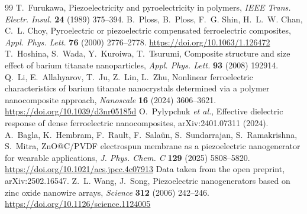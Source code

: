 \documentclass[11pt,a4paper]{article}
\begin{document}
\begin{thebibliography}{99}
 T.~Furukawa, Piezoelectricity and pyroelectricity in polymers, \emph{IEEE Trans. Electr. Insul.} \textbf{24} (1989) 375--394.
 B.~Ploss, B.~Ploss, F.~G. Shin, H.~L.~W. Chan, C.~L. Choy, Pyroelectric or piezoelectric compensated ferroelectric composites, \emph{Appl. Phys. Lett.} \textbf{76} (2000) 2776--2778. \url{https://doi.org/10.1063/1.126472}
 T.~Hoshina, S.~Wada, Y.~Kuroiwa, T.~Tsurumi, Composite structure and size effect of barium titanate nanoparticles, \emph{Appl. Phys. Lett.} \textbf{93} (2008) 192914.
 Q.~Li, E.~Allahyarov, T.~Ju, Z.~Lin, L.~Zhu, Nonlinear ferroelectric characteristics of barium titanate nanocrystals determined via a polymer nanocomposite approach, \emph{Nanoscale} \textbf{16} (2024) 3606--3621. \url{https://doi.org/10.1039/d3nr05185d}
 O.~Pylypchuk \emph{et al.}, Effective dielectric response of dense ferroelectric nanocomposites, arXiv:2401.07311 (2024).
 A.~Bagla, K.~Hembram, F.~Rault, F.~Sala\"un, S.~Sundarrajan, S.~Ramakrishna, S.~Mitra, ZnO@C/PVDF electrospun membrane as a piezoelectric nanogenerator for wearable applications, \emph{J. Phys. Chem. C} \textbf{129} (2025) 5808--5820. \url{https://doi.org/10.1021/acs.jpcc.4c07913} Data taken from the open preprint, arXiv:2502.16547.
 Z.~L. Wang, J.~Song, Piezoelectric nanogenerators based on zinc oxide nanowire arrays, \emph{Science} \textbf{312} (2006) 242--246. \url{https://doi.org/10.1126/science.1124005}
\end{thebibliography}
\end{document}
